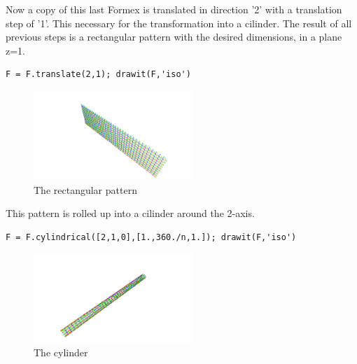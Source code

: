 {Now a copy of this last Formex is translated in direction '2' with a 
translation step of '1'. This necessary for the transformation into a cilinder.
The result of all previous steps is a rectangular pattern with the desired 
dimensions, in a plane z=1.
\begin{verbatim}
F = F.translate(2,1); drawit(F,'iso')
\end{verbatim}
\begin{figure}[h]
  \centering
  \begin{makeimage}
  \end{makeimage}
  \begin{latexonly}
    \includegraphics[width=6cm]{images/spiral-003}
  \end{latexonly}
  \begin{htmlonly}
  \end{htmlonly}  
  \caption{The rectangular pattern}
\end{figure}

This pattern is rolled up into a cilinder around the 2-axis. 
\begin{verbatim}
F = F.cylindrical([2,1,0],[1.,360./n,1.]); drawit(F,'iso')
\end{verbatim}
\begin{figure}[h]
  \centering
  \begin{makeimage}
  \end{makeimage}
  \begin{latexonly}
    \includegraphics[width=6cm]{images/spiral-004}
  \end{latexonly}
  \begin{htmlonly}
  \end{htmlonly}  
  \caption{The cylinder}
\end{figure}

}
